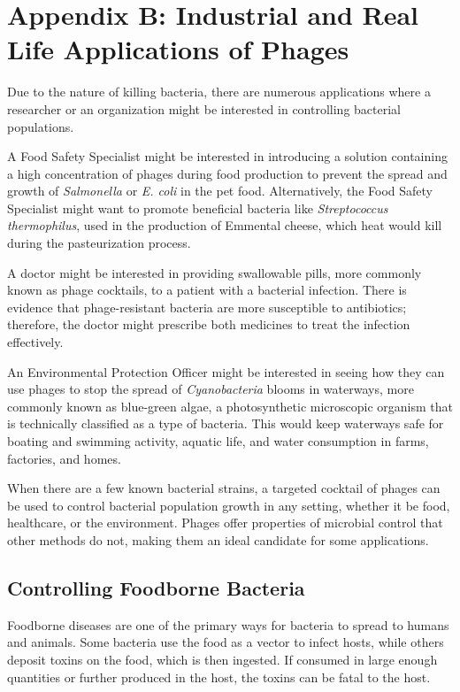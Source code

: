 \chapter{Appendix B: Industrial and Real Life Applications of Phages} 
\label{AppendixB} 

Due to the nature of killing bacteria, there are numerous applications where a researcher or an organization might be interested in controlling bacterial populations.

A Food Safety Specialist might be interested in introducing a solution containing a high concentration of phages during food production to prevent the spread and growth of \textit{Salmonella} or \textit{E. coli} in the pet food. 
Alternatively, the Food Safety Specialist might want to promote beneficial bacteria like \textit{Streptococcus thermophilus}, used in the production of Emmental cheese, which heat would kill during the pasteurization process. 

A doctor might be interested in providing swallowable pills, more commonly known as phage cocktails, to a patient with a bacterial infection.
There is evidence that phage-resistant bacteria are more susceptible to antibiotics; therefore, the doctor might prescribe both medicines to treat the infection effectively. 

An Environmental Protection Officer might be interested in seeing how they can use phages to stop the spread of \textit{Cyanobacteria} blooms in waterways, more commonly known as blue-green algae, a photosynthetic microscopic organism that is technically classified as a type of bacteria.
This would keep waterways safe for boating and swimming activity, aquatic life, and water consumption in farms, factories, and homes. 

When there are a few known bacterial strains, a targeted cocktail of phages can be used to control bacterial population growth in any setting, whether it be food, healthcare, or the environment.
Phages offer properties of microbial control that other methods do not, making them an ideal candidate for some applications. 

\section{Controlling Foodborne Bacteria}
\label{sec:AppendixB:controlling_foodborne_bacteria}
Foodborne diseases are one of the primary ways for bacteria to spread to humans and animals.
Some bacteria use the food as a vector to infect hosts, while others deposit toxins on the food, which is then ingested.
If consumed in large enough quantities or further produced in the host, the toxins can be fatal to the host.

